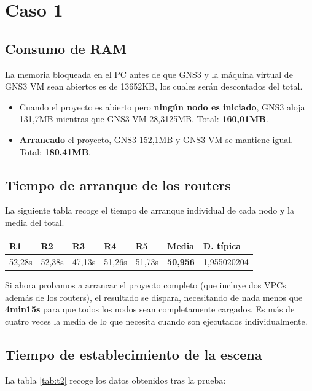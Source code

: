 \section{Caso 1}
\subsection{Consumo de RAM}
La memoria bloqueada en el PC antes de que GNS3 y la máquina virtual de GNS3 VM sean abiertos es de 13652KB, los cuales serán descontados del total.

\begin{itemize}
\item Cuando el proyecto es abierto pero \textbf{ningún nodo es iniciado}, GNS3 aloja 131,7MB mientras que GNS3 VM 28,3125MB. Total: \textbf{160,01MB}.
\item \textbf{Arrancado} el proyecto, GNS3 152,1MB y GNS3 VM se mantiene igual. Total: \textbf{180,41MB}.
\end{itemize}

\subsection{Tiempo de arranque de los routers}
La siguiente tabla recoge el tiempo de arranque individual de cada nodo y la media del total.

\begin{table}[H]
\centering
\begin{tabular}{|l|l|l|l|l|l|l|}
\hline
\textbf{R1} & \textbf{R2} 	& \textbf{R3} 	& \textbf{R4} 	& \textbf{R5} 	& \textbf{Media}	&	\textbf{D. típica}	\\ \hline
52,28s		& 52,38s		& 47,13s		& 51,26s		& 51,73s		& \textbf{50,956}	&	1,955020204			\\ \hline
\end{tabular}
\label{tab:t1}
\end{table}

Si ahora probamos a arrancar el proyecto completo (que incluye dos VPCs además de los routers), el resultado se dispara, necesitando de nada menos que \textbf{4min15s} para que todos los nodos sean completamente cargados. Es más de cuatro veces la media de lo que necesita cuando son ejecutados individualmente.

\subsection{Tiempo de establecimiento de la escena}
La tabla \ref{tab:t2} recoge los datos obtenidos tras la prueba:

